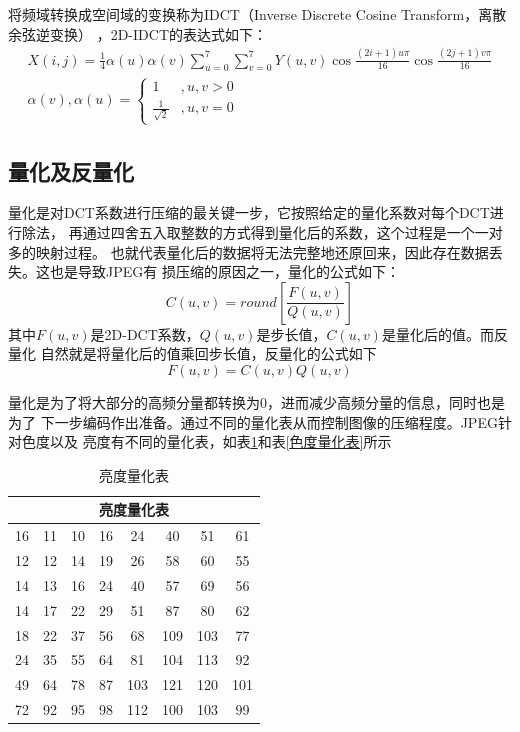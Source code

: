 \documentclass{article}
\numberwithin {equation}{section}
\begin{document}
\begin{spacing}{1.25}
    将频域转换成空间域的变换称为IDCT（Inverse Discrete Cosine Transform，离散余弦逆变换）
    ，2D-IDCT的表达式如下：
    \begin{equation}
      \begin{gathered}
        X(i,j)=\frac{1}{4}\alpha(u)\alpha(v)\sum_{u=0}^{7}\sum_{v=0}^{7}
        Y(u,v)\cos\frac{(2i+1)u\pi}{16}\cos\frac{(2j+1)v\pi}{16}\\
          \alpha (v),\alpha (u) = \begin{cases}
            1 &,u,v>0\\
            \frac{1}{\sqrt{2}} &,u,v=0
          \end{cases}
      \end{gathered}
    \end{equation}
  \subsection{量化及反量化}
    \vspace{1em}
    量化是对DCT系数进行压缩的最关键一步，它按照给定的量化系数对每个DCT进行除法，
    再通过四舍五入取整数的方式得到量化后的系数，这个过程是一个一对多的映射过程。
    也就代表量化后的数据将无法完整地还原回来，因此存在数据丢失。这也是导致JPEG有
    损压缩的原因之一，量化的公式如下：
    \begin{equation}
      C(u,v)=round\left[\frac{F(u,v)}{Q(u,v)}\right]
    \end{equation}
    其中$F(u,v)$是2D-DCT系数，$Q(u,v)$是步长值，$C(u,v)$是量化后的值。而反量化
    自然就是将量化后的值乘回步长值，反量化的公式如下
    \begin{equation}
      F(u,v)=C(u,v)Q(u,v)
    \end{equation}

    量化是为了将大部分的高频分量都转换为0，进而减少高频分量的信息，同时也是为了
    下一步编码作出准备。通过不同的量化表从而控制图像的压缩程度。JPEG针对色度以及
    亮度有不同的量化表，如表\ref{亮度量化表}和表\ref{色度量化表}所示

    \begin{table}[H]
      \caption{亮度量化表}
      \label{亮度量化表}
      \centering
      \begin{tabular}{cccccccc}
        \toprule
        \multicolumn{8}{c}{亮度量化表}\\
        \midrule
        16 & 11 & 10 & 16 & 24 & 40 & 51 & 61 \\
        12 & 12 & 14 & 19 & 26 & 58 & 60 & 55 \\
        14 & 13 & 16 & 24 & 40 & 57 & 69 & 56 \\
        14 & 17 & 22 & 29 & 51 & 87 & 80 & 62 \\
        18 & 22 & 37 & 56 & 68 & 109 & 103 & 77 \\
        24 & 35 & 55 & 64 & 81 & 104 & 113 & 92 \\
        49 & 64 & 78 & 87 & 103 & 121 & 120 & 101 \\
        72 & 92 & 95 & 98 & 112 & 100 & 103 & 99 \\
        \bottomrule
      \end{tabular}
    \end{table}


\end{spacing}
\end{document}
